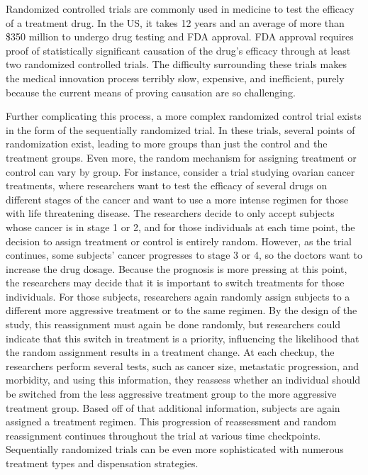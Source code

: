Randomized controlled trials are commonly used in medicine to test the efficacy of a treatment drug.  In the US, it takes 12 years and an average of more than \$350 million to undergo drug testing and FDA approval.\cite{drugapproval}  FDA approval requires proof of statistically significant causation of the drug's efficacy through at least two randomized controlled trials.  The difficulty surrounding these trials makes the medical innovation process terribly slow, expensive, and inefficient, purely because the current means of proving causation are so challenging.  
 
Further complicating this process, a more complex randomized control trial exists in the form of the sequentially randomized trial.  In these trials, several points of randomization exist, leading to more groups than just the control and the treatment groups.  Even more, the random mechanism for assigning treatment or control can vary by group.  For instance, consider a trial studying ovarian cancer treatments, where researchers want to test the efficacy of several drugs on different stages of the cancer and want to use a more intense regimen for those with life threatening disease.  The researchers decide to only accept subjects whose cancer is in stage 1 or 2, and for those individuals at each time point, the decision to assign treatment or control is entirely random.  However, as the trial continues, some subjects' cancer progresses to stage 3 or 4, so the doctors want to increase the drug dosage.  Because the prognosis is more pressing at this point, the researchers may decide that it is important to switch treatments for those individuals.  For those subjects, researchers again randomly assign subjects to a different more aggressive treatment or to the same regimen.   By the design of the study, this reassignment must again be done randomly, but researchers could indicate that this switch in treatment is a priority, influencing the likelihood that the random assignment results in a treatment change.  At each checkup, the researchers perform several tests, such as cancer size, metastatic progression, and morbidity, and using this information, they reassess whether an individual should be switched from the less aggressive treatment group to the more aggressive treatment group. Based off of that additional information, subjects are again assigned a treatment regimen.  This progression of reassessment and random reassignment continues throughout the trial at various time checkpoints.  Sequentially randomized trials can be even more sophisticated with numerous treatment types and dispensation strategies.\cite{doi:10.1093/jnci/djm185}  

